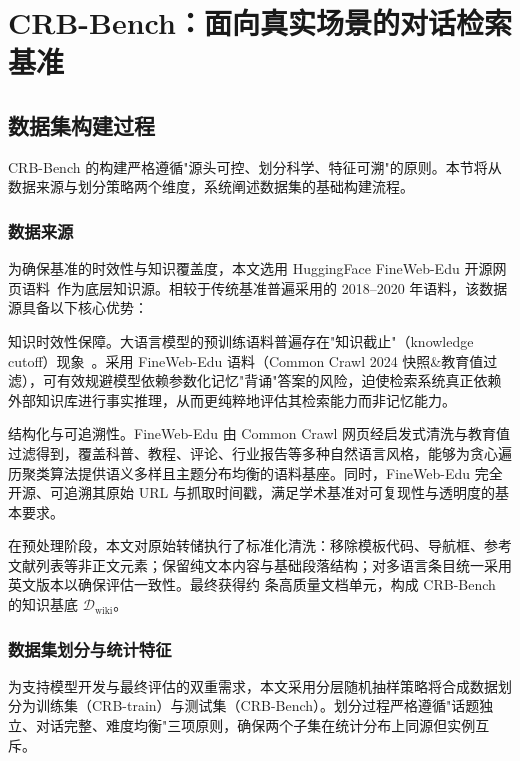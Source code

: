 \chapter{CRB-Bench：面向真实场景的对话检索基准}

\section{数据集构建过程}
\label{sec:dataset_construction}

CRB-Bench 的构建严格遵循"源头可控、划分科学、特征可溯"的原则。本节将从数据来源与划分策略两个维度，系统阐述数据集的基础构建流程。

\subsection{数据来源}

为确保基准的时效性与知识覆盖度，本文选用 HuggingFace FineWeb-Edu 开源网页语料~\citep{penedo2024finewebedufineweb}作为底层知识源。相较于传统基准普遍采用的 2018--2020 年语料，该数据源具备以下核心优势：

知识时效性保障。大语言模型的预训练语料普遍存在"知识截止"（knowledge cutoff）现象~\citep{kandpal2023largelanguagemodelsstruggle}。采用 FineWeb-Edu 语料（Common Crawl 2024 快照&教育值过滤），可有效规避模型依赖参数化记忆"背诵"答案的风险，迫使检索系统真正依赖外部知识库进行事实推理，从而更纯粹地评估其检索能力而非记忆能力。

结构化与可追溯性。FineWeb-Edu 由 Common Crawl 网页经启发式清洗与教育值过滤得到，覆盖科普、教程、评论、行业报告等多种自然语言风格，能够为贪心遍历聚类算法提供语义多样且主题分布均衡的语料基座。同时，FineWeb-Edu 完全开源、可追溯其原始 URL 与抓取时间戳，满足学术基准对可复现性与透明度的基本要求。

在预处理阶段，本文对原始转储执行了标准化清洗：移除模板代码、导航框、参考文献列表等非正文元素；保留纯文本内容与基础段落结构；对多语言条目统一采用英文版本以确保评估一致性。最终获得约  条高质量文档单元，构成 CRB-Bench 的知识基底 $\mathcal{D}_{\text{wiki}}$。

\subsection{数据集划分与统计特征}

为支持模型开发与最终评估的双重需求，本文采用分层随机抽样策略将合成数据划分为训练集（CRB-train）与测试集（CRB-Bench）。划分过程严格遵循"话题独立、对话完整、难度均衡"三项原则，确保两个子集在统计分布上同源但实例互斥。

